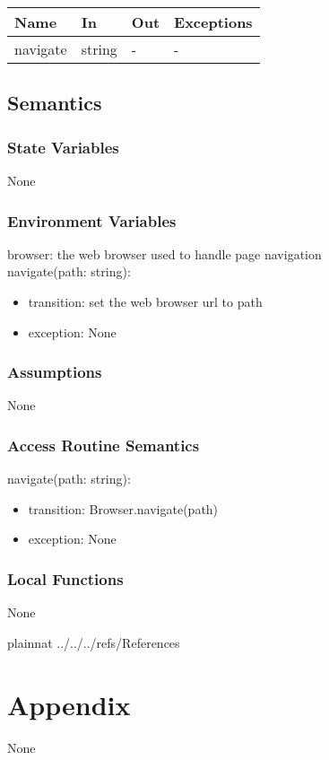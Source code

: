 \documentclass[12pt, titlepage]{article}
\begin{document}
\begin{center}
\begin{tabular}{p{2cm} p{4cm} p{2cm} p{2cm}}
\hline
\textbf{Name} & \textbf{In} & \textbf{Out} & \textbf{Exceptions} \\
\hline
navigate & string & - & - \\
\hline
\end{tabular}
\end{center}

\subsection{Semantics}

\subsubsection{State Variables}

None

\subsubsection{Environment Variables}

browser: the web browser used to handle page navigation\\
navigate(path: string):
\begin{itemize}
    \item transition: set the web browser url to path
    \item exception:    None
\end{itemize}

\subsubsection{Assumptions}

None

\subsubsection{Access Routine Semantics}

\noindent navigate(path: string):
\begin{itemize}
    \item transition: Browser.navigate(path)
    \item exception: None
\end{itemize}


\subsubsection{Local Functions}

None

\newpage

 {plainnat}
 {../../../refs/References}

\newpage

\section{Appendix} \label{Appendix}

None
\end{document}

